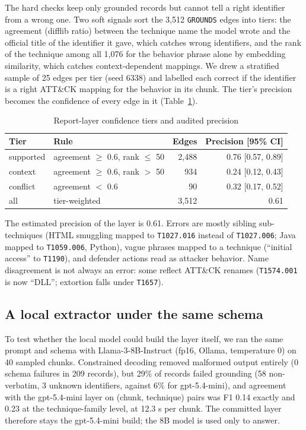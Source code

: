 \documentclass[conference]{IEEEtran}
\newcommand{\id}[1]{\texttt{#1}}
\begin{document}
The hard checks keep only grounded records but cannot tell a right identifier from a wrong one. Two soft signals sort the 3,512 \texttt{GROUNDS} edges into tiers: the agreement (difflib ratio) between the technique name the model wrote and the official title of the identifier it gave, which catches wrong identifiers, and the rank of the technique among all 1,076 for the behavior phrase alone by embedding similarity, which catches context-dependent mappings. We drew a stratified sample of 25 edges per tier (seed 6338) and labelled each correct if the identifier is a right ATT\&CK mapping for the behavior in its chunk. The tier's precision becomes the confidence of every edge in it (Table~\ref{tab:audit}).

\begin{table}[t]
\caption{Report-layer confidence tiers and audited precision}
\label{tab:audit}
\centering
\footnotesize
\begin{tabular}{@{}l l r r@{}}
\toprule
Tier & Rule & Edges & Precision [95\% CI] \\
\midrule
supported & agreement $\ge$ 0.6, rank $\le$ 50 & 2,488 & 0.76 [0.57, 0.89] \\
context & agreement $\ge$ 0.6, rank $>$ 50 & 934 & 0.24 [0.12, 0.43] \\
conflict & agreement $<$ 0.6 & 90 & 0.32 [0.17, 0.52] \\
\midrule
all & tier-weighted & 3,512 & 0.61 \\
\bottomrule
\end{tabular}
\end{table}

The estimated precision of the layer is 0.61. Errors are mostly sibling sub-techniques (HTML smuggling mapped to \id{T1027.016} instead of \id{T1027.006}; Java mapped to \id{T1059.006}, Python), vague phrases mapped to a technique (``initial access'' to \id{T1190}), and defender actions read as attacker behavior. Name disagreement is not always an error: some reflect ATT\&CK renames (\id{T1574.001} is now ``DLL''; extortion falls under \id{T1657}).

\subsection{A local extractor under the same schema}

To test whether the local model could build the layer itself, we ran the same prompt and schema with Llama-3-8B-Instruct (fp16, Ollama, temperature 0) on 40 sampled chunks. Constrained decoding removed malformed output entirely (0 schema failures in 209 records), but 29\% of records failed grounding (58 non-verbatim, 3 unknown identifiers, against 6\% for gpt-5.4-mini), and agreement with the gpt-5.4-mini layer on (chunk, technique) pairs was F1 0.14 exactly and 0.23 at the technique-family level, at 12.3 s per chunk. The committed layer therefore stays the gpt-5.4-mini build; the 8B model is used only to answer.
\end{document}
